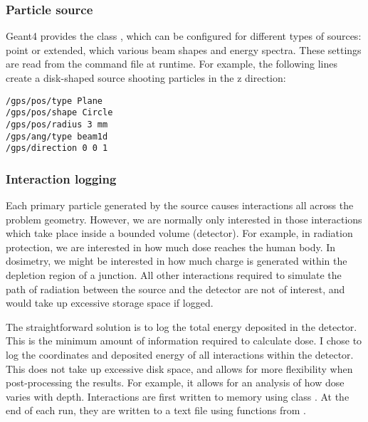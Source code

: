 \subsubsection{Particle source}
Geant4 provides the class ,
which can be configured for different types of sources:
point or extended, which various beam shapes and energy spectra.
These settings are read from the command file at runtime.
For example, the following lines create a disk-shaped source
shooting particles in the z direction:
\begin{verbatim}
/gps/pos/type Plane
/gps/pos/shape Circle
/gps/pos/radius 3 mm
/gps/ang/type beam1d
/gps/direction 0 0 1
\end{verbatim}
\subsubsection{Interaction logging}
Each primary particle generated by the source
causes interactions all across the problem geometry.
However, we are normally only interested in those interactions which
take place inside a bounded volume (detector).
For example, in radiation protection,
we are interested in how much dose reaches the human body.
In dosimetry, we might be interested in how much charge is generated
within the depletion region of a junction.
All other interactions required to simulate the path of radiation 
between the source and the detector are not of interest,
and would take up excessive storage space if logged.

The straightforward solution is to log the total energy deposited in the detector.
This is the minimum amount of information required to calculate dose.
I chose to log the coordinates and deposited energy of all interactions within the detector.
This does not take up excessive disk space,
and allows for more flexibility when post-processing the results.
For example, it allows for an analysis of how dose varies with depth.
Interactions are first written to memory using class .
At the end of each run, they are written to a text file
using functions from .
